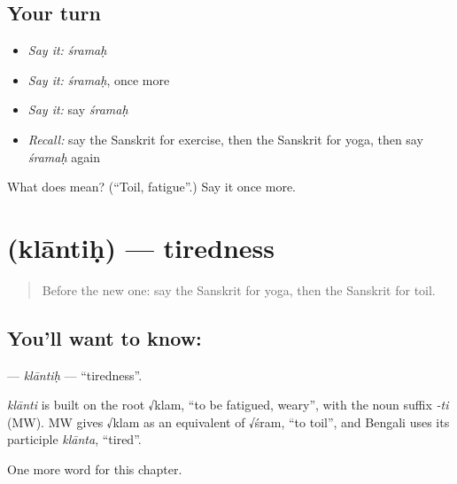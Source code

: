 \subsection*{Your turn}
\begin{itemize}
\raggedright
  \item \emph{Say it:} \emph{śramaḥ}
  \item \emph{Say it:} \emph{śramaḥ}, once more
  \item \emph{Say it:} say \emph{śramaḥ}
  \item \emph{Recall:} say the Sanskrit for exercise, then the Sanskrit for yoga, then say \emph{śramaḥ} again
\end{itemize}

\begin{tcolorbox}[breakable,colback=teal!4,colframe=teal!35!black,title={Before you move on}]
What does  mean? (\textquotedblleft{}Toil, fatigue\textquotedblright{}.) Say it once more.
\end{tcolorbox}
\section[\texorpdfstring{\sk{क्लान्तिः} (klāntiḥ)}{क्लान्तिः (klāntiḥ)}]{ (klāntiḥ) — tiredness}

\label{lesson:SA-C211-klantih}



\begin{quote}
Before the new one: say the Sanskrit for yoga, then the Sanskrit for toil.
\end{quote}

\subsection*{You'll want to know: }
\textbf{} — \emph{klāntiḥ} — \textquotedblleft{}tiredness\textquotedblright{}.

\begin{cousinweb}
\emph{klānti} is built on the root √klam, \textquotedblleft{}to be fatigued, weary\textquotedblright{}, with the noun suffix \emph{-ti} (MW). MW gives √klam as an equivalent of √śram, \textquotedblleft{}to toil\textquotedblright{}, and Bengali uses its participle \emph{klānta}, \textquotedblleft{}tired\textquotedblright{}.
\end{cousinweb}

\begin{grammarlens}[title={What you've built}]
One more word for this chapter.
\end{grammarlens}

